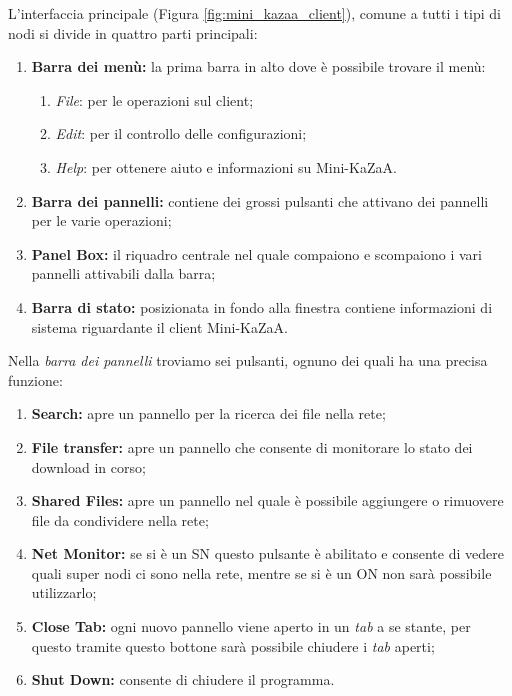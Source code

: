 L'interfaccia principale (Figura \ref{fig:mini_kazaa_client}), comune a tutti i tipi di nodi si divide in quattro parti principali:
\begin{enumerate}
 \item \textbf{Barra dei menù:}
la prima barra in alto dove è possibile trovare il menù:
	\begin{enumerate}
		\item \textit{File}: per le operazioni sul client;
		\item \textit{Edit}: per il controllo delle configurazioni;
		\item \textit{Help}: per ottenere aiuto e informazioni su Mini-KaZaA.
	\end{enumerate}

 \item \textbf{Barra dei pannelli:}
contiene dei grossi pulsanti che attivano dei pannelli per le varie operazioni;

 \item \textbf{Panel Box:}
il riquadro centrale nel quale compaiono e scompaiono i vari pannelli attivabili dalla barra;

 \item \textbf{Barra di stato:}
posizionata in fondo alla finestra contiene informazioni di sistema riguardante il client Mini-KaZaA.
\end{enumerate}

Nella \emph{barra dei pannelli} troviamo sei pulsanti, ognuno dei quali ha una precisa funzione:
\begin{enumerate}
 \item \textbf{Search:} apre un pannello per la ricerca dei file nella rete;
 \item \textbf{File transfer:} apre un pannello che consente di monitorare lo stato dei download in corso;
 \item \textbf{Shared Files:} apre un pannello nel quale è possibile aggiungere o rimuovere file da condividere nella rete;
 \item \textbf{Net Monitor:} se si è un SN questo pulsante è abilitato e consente di vedere quali super nodi ci sono nella rete, mentre se si è un ON non sarà possibile utilizzarlo;
 \item \textbf{Close Tab:} ogni nuovo pannello viene aperto in un \emph{tab} a se stante, per questo tramite questo bottone sarà possibile chiudere i \emph{tab} aperti;
 \item \textbf{Shut Down:} consente di chiudere il programma.
\end{enumerate}



